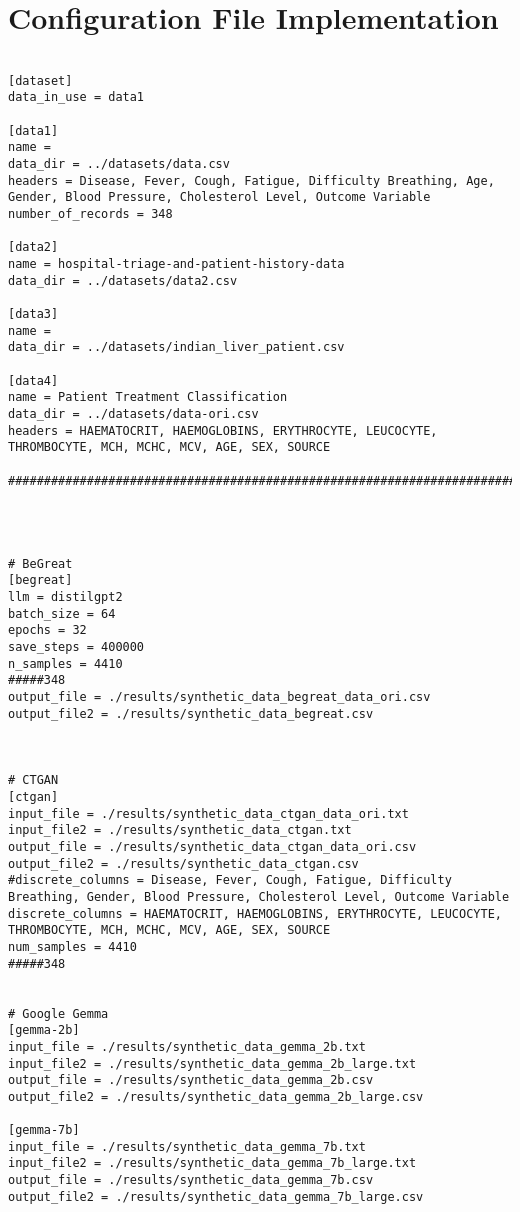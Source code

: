 \chapter*{Configuration File Implementation}
\label{app:config_implementation}

\begin{verbatim}

[dataset]
data_in_use = data1

[data1]
name = 
data_dir = ../datasets/data.csv
headers = Disease, Fever, Cough, Fatigue, Difficulty Breathing, Age, Gender, Blood Pressure, Cholesterol Level, Outcome Variable
number_of_records = 348

[data2]
name = hospital-triage-and-patient-history-data
data_dir = ../datasets/data2.csv

[data3]
name = 
data_dir = ../datasets/indian_liver_patient.csv

[data4]
name = Patient Treatment Classification
data_dir = ../datasets/data-ori.csv
headers = HAEMATOCRIT, HAEMOGLOBINS, ERYTHROCYTE, LEUCOCYTE, THROMBOCYTE, MCH, MCHC, MCV, AGE, SEX, SOURCE

################################################################################################################




# BeGreat
[begreat]
llm = distilgpt2
batch_size = 64
epochs = 32
save_steps = 400000
n_samples = 4410
#####348
output_file = ./results/synthetic_data_begreat_data_ori.csv
output_file2 = ./results/synthetic_data_begreat.csv



# CTGAN
[ctgan]
input_file = ./results/synthetic_data_ctgan_data_ori.txt
input_file2 = ./results/synthetic_data_ctgan.txt
output_file = ./results/synthetic_data_ctgan_data_ori.csv
output_file2 = ./results/synthetic_data_ctgan.csv
#discrete_columns = Disease, Fever, Cough, Fatigue, Difficulty Breathing, Gender, Blood Pressure, Cholesterol Level, Outcome Variable
discrete_columns = HAEMATOCRIT, HAEMOGLOBINS, ERYTHROCYTE, LEUCOCYTE, THROMBOCYTE, MCH, MCHC, MCV, AGE, SEX, SOURCE
num_samples = 4410
#####348


# Google Gemma
[gemma-2b]
input_file = ./results/synthetic_data_gemma_2b.txt
input_file2 = ./results/synthetic_data_gemma_2b_large.txt
output_file = ./results/synthetic_data_gemma_2b.csv
output_file2 = ./results/synthetic_data_gemma_2b_large.csv

[gemma-7b]
input_file = ./results/synthetic_data_gemma_7b.txt
input_file2 = ./results/synthetic_data_gemma_7b_large.txt
output_file = ./results/synthetic_data_gemma_7b.csv
output_file2 = ./results/synthetic_data_gemma_7b_large.csv


\end{verbatim}
